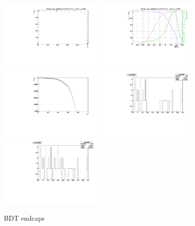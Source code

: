 \begin{figure}
  \centering
  \includegraphics[width=0.45\textwidth]{Figures/bdt/BDT_endcaps_roc}
  \includegraphics[width=0.45\textwidth]{Figures/bdt/BDT_endcaps_eff} 
  \includegraphics[width=0.45\textwidth]{Figures/bdt/BDT_endcaps_roc_zoom}
  \includegraphics[width=0.45\textwidth]{Figures/bdt/BDT_endcaps_mass}
  \includegraphics[width=0.45\textwidth]{Figures/bdt/BDT_endcaps_mass_unblind}
\caption{BDT endcaps}
\end{figure}

